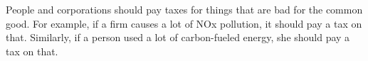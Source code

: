 People and corporations should pay taxes for things that are bad for the common good. For example, if a firm causes a lot of NOx pollution, it should pay a tax on that. Similarly, if a person used a lot of carbon-fueled energy, she should pay a tax on that.
